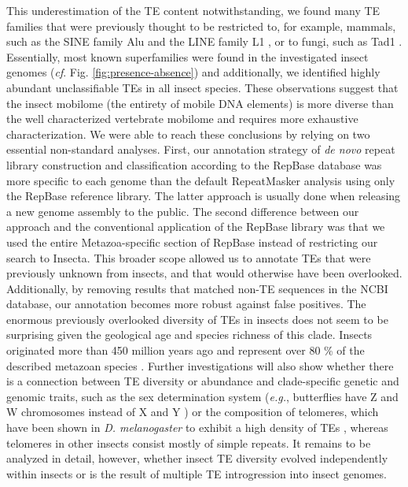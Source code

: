This underestimation of the TE content notwithstanding, we found many TE
families that were previously thought to be restricted to, for example,
mammals, such as the SINE family Alu \citep{Kriegs2007} and the LINE
family L1 \citep{Liu2003}, or to fungi, such as Tad1
\citep{Cambareri1994}. Essentially, most known superfamilies were found in
the investigated insect genomes (\emph{cf}. Fig. \ref{fig:presence-absence}) and additionally, we
identified highly abundant unclassifiable TEs in all insect species.
These observations suggest that the insect mobilome (the entirety of
mobile DNA elements) is more diverse than the well characterized
vertebrate mobilome \citep{Chalopin2015} and requires more exhaustive
characterization. We were able to reach these conclusions by relying on
two essential non-standard analyses. First, our annotation strategy of
\emph{de novo} repeat library construction and classification according
to the RepBase database was more specific to each genome than the
default RepeatMasker analysis using only the RepBase reference library.
The latter approach is usually done when releasing a new genome assembly
to the public. The second difference between our approach and the
conventional application of the RepBase library was that we used the
entire Metazoa-specific section of RepBase instead of restricting our
search to Insecta. This broader scope allowed us to annotate TEs that
were previously unknown from insects, and that would otherwise have been
overlooked. Additionally, by removing results that matched non-TE
sequences in the NCBI database, our annotation becomes more robust
against false positives. The enormous previously overlooked diversity of
TEs in insects does not seem to be surprising given the geological age
and species richness of this clade. Insects originated more than 450
million years ago \citep{Misof2014} and represent over 80 \% of the
described metazoan species \citep{Grimaldi2005}. Further investigations
will also show whether there is a connection between TE diversity or
abundance and clade-specific genetic and genomic traits, such as the sex
determination system (\emph{e.g.}, butterflies have Z and W chromosomes
instead of X and Y \citep{Traut1997}) or the composition of telomeres,
which have been shown in \emph{D. melanogaster} to exhibit a high
density of TEs \citep{Levis1993}, whereas telomeres in other insects
consist mostly of simple repeats. It remains to be analyzed in detail,
however, whether insect TE diversity evolved independently within
insects or is the result of multiple TE introgression into insect
genomes.

